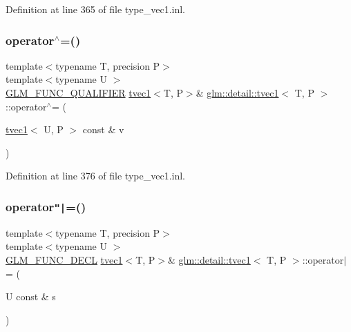 Definition at line 365 of file type\+\_\+vec1.\+inl.

\mbox{\label{structglm_1_1detail_1_1tvec1_ab48008a42136d1116d006c44cf0a6da1}} 
\subsubsection{\texorpdfstring{operator$^\wedge$=()}{operator^=()}\hspace{0.1cm}{\footnotesize\ttfamily [4/4]}}
{\footnotesize\ttfamily template$<$typename T, precision P$>$ \\
template$<$typename U $>$ \\
\hyperlink{setup_8hpp_a33fdea6f91c5f834105f7415e2a64407}{G\+L\+M\+\_\+\+F\+U\+N\+C\+\_\+\+Q\+U\+A\+L\+I\+F\+I\+ER} \hyperlink{structglm_1_1detail_1_1tvec1}{tvec1}$<$T, P$>$\& \hyperlink{structglm_1_1detail_1_1tvec1}{glm\+::detail\+::tvec1}$<$ T, P $>$\+::operator$^\wedge$= (\begin{DoxyParamCaption}\item[{\hyperlink{structglm_1_1detail_1_1tvec1}{tvec1}$<$ U, P $>$ const \&}]{v }\end{DoxyParamCaption})}



Definition at line 376 of file type\+\_\+vec1.\+inl.

\mbox{\label{structglm_1_1detail_1_1tvec1_a879683e788198a53a1c4661a1b5af383}} 
\subsubsection{\texorpdfstring{operator\texttt{"|}=()}{operator|=()}\hspace{0.1cm}{\footnotesize\ttfamily [1/4]}}
{\footnotesize\ttfamily template$<$typename T, precision P$>$ \\
template$<$typename U $>$ \\
\hyperlink{setup_8hpp_ab2d052de21a70539923e9bcbf6e83a51}{G\+L\+M\+\_\+\+F\+U\+N\+C\+\_\+\+D\+E\+CL} \hyperlink{structglm_1_1detail_1_1tvec1}{tvec1}$<$T, P$>$\& \hyperlink{structglm_1_1detail_1_1tvec1}{glm\+::detail\+::tvec1}$<$ T, P $>$\+::operator$\vert$= (\begin{DoxyParamCaption}\item[{U const \&}]{s }\end{DoxyParamCaption})}

